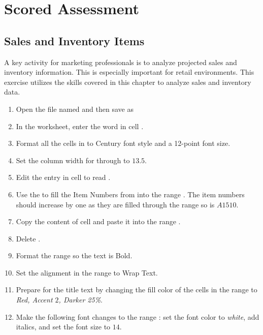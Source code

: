 \section{Scored Assessment}

\subsection{Sales and Inventory Items}

A key activity for marketing professionals is to analyze projected sales and inventory information. This is especially important for retail environments. This exercise utilizes the skills covered in this chapter to analyze sales and inventory data.

\begin{enumerate}
	\item Open the file named  and then save as 
	\item In the  worksheet, enter the word  in cell .
	\item Format all the cells in  to Century font style and a 12-point font size.
	\item Set the column width for  through  to $ 13.5 $.
	\item Edit the entry in cell  to read .
	\item Use the  to fill the Item Numbers from  into the range . The item numbers should increase by one as they are filled through the range so  is $ A1510 $.
	\item Copy the content of cell  and paste it into the range .
	\item Delete .
	\item Format the range  so the text is Bold.
	\item Set the alignment in the range  to Wrap Text.
	\item Prepare  for the title text by changing the fill color of the cells in the range  to \textit{Red, Accent $ 2 $, Darker 25\%}.
	\item Make the following font changes to the range : set the font color to \textit{white}, add italics, and set the font size to $ 14 $.

\end{enumerate}
